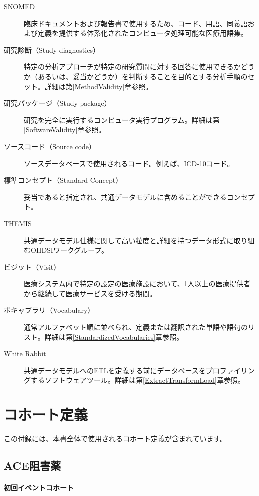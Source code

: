 \documentclass[
  11pt]{book}
\theoremstyle{definition}
\theoremstyle{definition}
\theoremstyle{definition}
\theoremstyle{definition}
\theoremstyle{remark}
\begin{document}
\begin{description}
\item[SNOMED]
臨床ドキュメントおよび報告書で使用するため、コード、用語、同義語および定義を提供する体系化されたコンピュータ処理可能な医療用語集。
\item[研究診断（Study diagnostics）]
特定の分析アプローチが特定の研究質問に対する回答に使用できるかどうか（あるいは、妥当かどうか）を判断することを目的とする分析手順のセット。詳細は第\ref{MethodValidity}章参照。
\item[研究パッケージ（Study package）]
研究を完全に実行するコンピュータ実行プログラム。詳細は第\ref{SoftwareValidity}章参照。
\item[ソースコード（Source code）]
ソースデータベースで使用されるコード。例えば、ICD-10コード。
\item[標準コンセプト（Standard Concept）]
妥当であると指定され、共通データモデルに含めることができるコンセプト。
\item[THEMIS]
共通データモデル仕様に関して高い粒度と詳細を持つデータ形式に取り組むOHDSIワークグループ。
\item[ビジット（Visit）]
医療システム内で特定の設定の医療施設において、1人以上の医療提供者から継続して医療サービスを受ける期間。
\item[ボキャブラリ（Vocabulary）]
通常アルファベット順に並べられ、定義または翻訳された単語や語句のリスト。詳細は第\ref{StandardizedVocabularies}章参照。
\item[White Rabbit]
共通データモデルへのETLを定義する前にデータベースをプロファイリングするソフトウェアツール。詳細は第\ref{ExtractTransformLoad}章参照。
\end{description}

\chapter{コホート定義}\label{CohortDefinitions}

この付録には、本書全体で使用されるコホート定義が含まれています。

\section{ACE阻害薬}\label{AceInhibitors}

\subsubsection*{初回イベントコホート}\label{ux521dux56deux30a4ux30d9ux30f3ux30c8ux30b3ux30dbux30fcux30c8}
\end{document}

